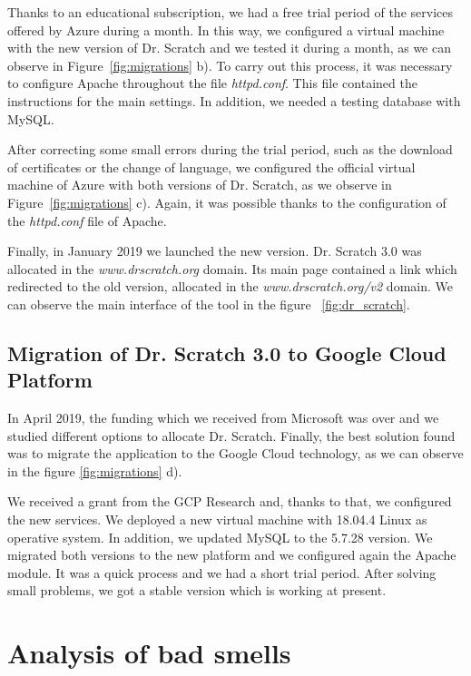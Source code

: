 Thanks to an educational subscription, we had a free trial period of the services offered by Azure during a month. In this way, we configured a virtual machine with the new version of Dr. Scratch and we tested it during a month, as we can observe in Figure~\ref{fig:migrations} b). To carry out this process, it was necessary to configure Apache throughout the file \textit{httpd.conf}. This file contained the instructions for the main settings. In addition, we needed a testing database with MySQL.

After correcting some small errors during the trial period, such as the download of certificates or the change of language,  we configured the official virtual machine of Azure with both versions of Dr. Scratch, as we observe in Figure~\ref{fig:migrations} c). Again, it was possible thanks to the configuration of the \textit{httpd.conf} file of Apache. 

Finally, in January 2019 we launched the new version. Dr. Scratch 3.0 was allocated in the \textit{www.drscratch.org} domain. Its main page contained a link which redirected to the old version, allocated in the \textit{www.drscratch.org/v2} domain. We can observe the main interface of the tool in the figure ~\ref{fig:dr_scratch}.


\subsection{Migration of Dr. Scratch 3.0 to Google Cloud Platform}
\label{subsec:mig_to_google}

In April 2019, the funding which we received from Microsoft was over and we studied different options to allocate Dr. Scratch. Finally, the best solution found was to migrate the application to the Google Cloud technology, as we can observe in the figure \ref{fig:migrations} d).
 
We received a grant from the GCP Research and, thanks to that, we configured the new services. We deployed a new virtual machine with 18.04.4 Linux as operative system. In addition, we updated MySQL to the 5.7.28 version. We migrated both versions to the new platform and we configured again the Apache module. It was a quick process and we had a short trial period. After solving small problems, we got a stable version which is working at present.


\section{Analysis of bad smells}
\label{sec:analysis}

